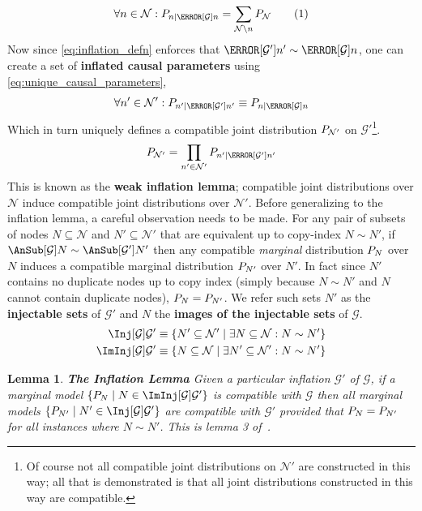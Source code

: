 \documentclass[aps, 10pt, english, twoside, pra, nofootinbib, longbibliography]{revtex4-1}
\theoremstyle{plain}
\newtheorem{lemma}[theorem]{Lemma}
\theoremstyle{definition}
\theoremstyle{remark}
\newcommand{\graph}{\mathcal{G}}
\newcommand{\nodes}{\mathcal{N}}
\newcommand{\term}[1]{\textcolor{Mahogany}{\textbf{#1}}}
\begin{document}
    \[ \forall n \in \nodes : \prob[n\mid \Pa[\graph]{n}] = \sum_{\nodes \setminus n} \prob[\nodes] \eq \label{eq:unique_causal_parameters}\]
    Now since \cref{eq:inflation_defn} enforces that $\Pa[\graph']{n'} \sim \Pa[\graph]{n}$, one can create a set of \term{inflated causal parameters} using \cref{eq:unique_causal_parameters},
    \[ \forall n' \in \nodes' : \prob[n'\mid \Pa[\graph']{n'}] \defined \prob[n\mid \Pa[\graph]{n}] \]
    Which in turn uniquely defines a compatible joint distribution $\prob[\nodes']$ on $\graph'$\footnote{Of course not all compatible joint distributions on $\nodes'$ are constructed in this way; all that is demonstrated is that all joint distributions constructed in this way are compatible.}.
    \[ \prob[\nodes'] = \prod_{n' \in \nodes'} \prob[n'\mid \Pa[\graph']{n'}] \]
    This is known as the \term{weak inflation lemma}; compatible joint distributions over $\nodes$ induce compatible joint distributions over $\nodes'$. Before generalizing to the inflation lemma, a careful observation needs to be made. For any pair of subsets of nodes $N \subseteq \nodes$ and $N' \subseteq \nodes'$ that are equivalent up to copy-index $N \sim N'$, if $\AnSub[\graph]{N} \sim \AnSub[\graph']{N'}$ then any compatible \textit{marginal} distribution $\prob[N]$ over $N$ induces a compatible marginal distribution $\prob[N']$ over $N'$. In fact since $N'$ contains no duplicate nodes up to copy index (simply because $N \sim N'$ and $N$ cannot contain duplicate nodes), $\prob[N] = \prob[N']$. We refer such sets $N'$ as the \term{injectable sets} of $\graph'$ and $N$ the \term{images of the injectable sets} of $\graph$.
    \begin{align*}
        \Inj[\graph]{\graph'} &\defined \bc{N' \subseteq \nodes' \mid \exists N \subseteq \nodes : N \sim N'} \\
        \ImInj[\graph]{\graph'} &\defined \bc{N \subseteq \nodes \mid \exists N' \subseteq \nodes' : N \sim N'}
    \end{align*}

    \begin{lemma}
        \label{lem:inflation}
        \term{The Inflation Lemma} Given a particular inflation $\graph'$ of $\graph$, if a marginal model $\bc{\prob[N] \mid N \in \ImInj[\graph]{\graph'}}$ is compatible with $\graph$ then all marginal models $\bc{\prob[N'] \mid N' \in \Inj[\graph]{\graph'}}$ are compatible with $\graph'$ provided that $\prob[N] = \prob[N']$ for all instances where $N \sim N'$.
        This is lemma 3 of~\cite{Inflation}.
    \end{lemma}
\end{document}

